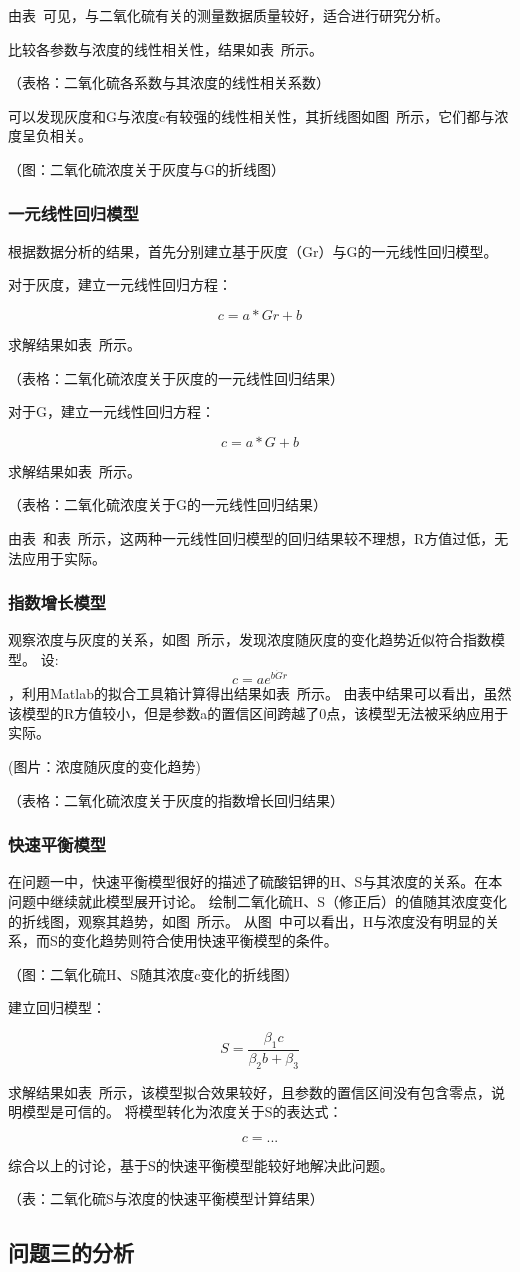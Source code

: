 由表~可见，与二氧化硫有关的测量数据质量较好，适合进行研究分析。

比较各参数与浓度的线性相关性，结果如表~所示。

（表格：二氧化硫各系数与其浓度的线性相关系数）

可以发现灰度和G与浓度c有较强的线性相关性，其折线图如图~所示，它们都与浓度呈负相关。

（图：二氧化硫浓度关于灰度与G的折线图）

\subsubsection{一元线性回归模型}

根据数据分析的结果，首先分别建立基于灰度（Gr）与G的一元线性回归模型。

对于灰度，建立一元线性回归方程：

$$c=a*Gr+b$$

求解结果如表~所示。

（表格：二氧化硫浓度关于灰度的一元线性回归结果）

对于G，建立一元线性回归方程：

$$c=a*G+b$$

求解结果如表~所示。

（表格：二氧化硫浓度关于G的一元线性回归结果）

由表~和表~所示，这两种一元线性回归模型的回归结果较不理想，R方值过低，无法应用于实际。

\subsubsection{指数增长模型}

观察浓度与灰度的关系，如图~所示，发现浓度随灰度的变化趋势近似符合指数模型。
设: $$c=ae^{b\dot Gr}$$，利用Matlab的拟合工具箱计算得出结果如表~所示。
由表中结果可以看出，虽然该模型的R方值较小，但是参数a的置信区间跨越了0点，该模型无法被采纳应用于实际。

(图片：浓度随灰度的变化趋势)

（表格：二氧化硫浓度关于灰度的指数增长回归结果）



\subsubsection{快速平衡模型}

在问题一中，快速平衡模型很好的描述了硫酸铝钾的H、S与其浓度的关系。在本问题中继续就此模型展开讨论。
绘制二氧化硫H、S（修正后）的值随其浓度变化的折线图，观察其趋势，如图~所示。
从图~中可以看出，H与浓度没有明显的关系，而S的变化趋势则符合使用快速平衡模型的条件。

（图：二氧化硫H、S随其浓度c变化的折线图）

建立回归模型：


   $$ S = \frac{\beta_1 c}{\beta_2b+\beta_3}$$


求解结果如表~所示，该模型拟合效果较好，且参数的置信区间没有包含零点，说明模型是可信的。
将模型转化为浓度关于S的表达式：


    $$c = ...$$


综合以上的讨论，基于S的快速平衡模型能较好地解决此问题。

（表：二氧化硫S与浓度的快速平衡模型计算结果）


\subsection{问题三的分析}
